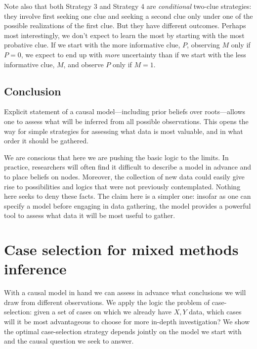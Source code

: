 \documentclass[
  12pt,
]{book}
\newenvironment{headerbox}{
  \definecolor{shadecolor}{rgb}{0.8, 0.8, 0.8}  %
  \color{black}
  \begin{shaded}}{\end{shaded}}
\begin{document}
Note also that both Strategy 3 and Strategy 4 are \emph{conditional} two-clue strategies: they involve first seeking one clue and seeking a second clue only under one of the possible realizations of the first clue. But they have different outcomes. Perhaps most interestingly, we don't expect to learn the most by starting with the most probative clue. If we start with the more informative clue, \(P\), observing \(M\) only if \(P=0\), we expect to end up with \emph{more} uncertainty than if we start with the less informative clue, \(M\), and observe \(P\) only if \(M=1\).

\hypertarget{conclusion}{%
\section{Conclusion}\label{conclusion}}

Explicit statement of a causal model---including prior beliefs over roots---allows one to assess what will be inferred from all possible observations. This opens the way for simple strategies for assessing what data is most valuable, and in what order it should be gathered.

We are conscious that here we are pushing the basic logic to the limits. In practice, researchers will often find it difficult to describe a model in advance and to place beliefs on nodes. Moreover, the collection of new data could easily give rise to possibilities and logics that were not previously contemplated. Nothing here seeks to deny these facts. The claim here is a simpler one: insofar as one can specify a model before engaging in data gathering, the model provides a powerful tool to assess what data it will be most useful to gather.

\hypertarget{caseselection}{%
\chapter{Case selection for mixed methods inference}\label{caseselection}}

\begin{headerbox}
With a causal model in hand we can assess in advance what conclusions we will draw from different observations. We apply the logic the problem of case-selection: given a set of cases on which we already have \(X,Y\) data, which cases will it be most advantageous to choose for more in-depth investigation? We show the optimal case-selection strategy depends jointly on the model we start with and the causal question we seek to answer.

\end{headerbox}
\end{document}
